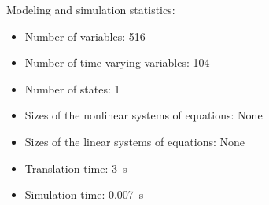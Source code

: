 \begin{contextbox}
  Modeling and simulation statistics:
  \begin{itemize}
    \item Number of variables: 516
    \item Number of time-varying variables: 104
    \item Number of states: 1
    \item Sizes of the nonlinear systems of equations: None
    \item Sizes of the linear systems of equations: None
    \item Translation time: \SI{3}{s}
    \item Simulation time: \SI{0.007}{s}
  \end{itemize}
\end{contextbox}